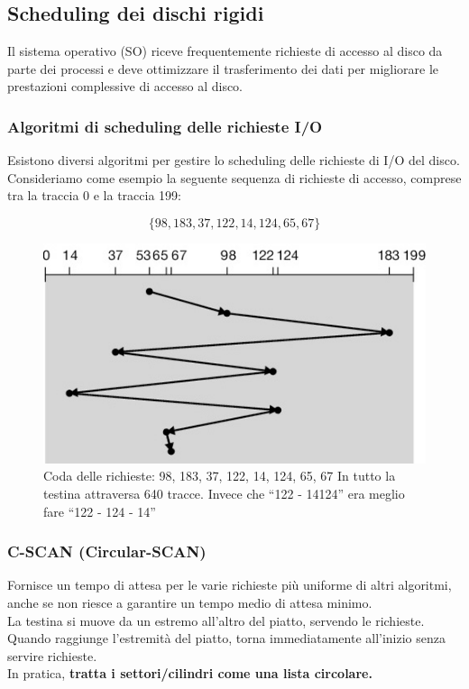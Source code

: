 \subsection{Scheduling dei dischi rigidi}

Il sistema operativo (SO) riceve frequentemente richieste di accesso al disco da parte dei processi e deve ottimizzare il trasferimento dei dati per migliorare le prestazioni complessive di accesso al disco.


\subsubsection{Algoritmi di scheduling delle richieste I/O}

Esistono diversi algoritmi per gestire lo scheduling delle richieste di I/O del disco. Consideriamo come esempio la seguente sequenza di richieste di accesso, comprese tra la traccia 0 e la traccia 199:

\[
\{ 98, 183, 37, 122, 14, 124, 65, 67 \}
\]


\begin{figure}[h] \centering \includegraphics[width=0.25\linewidth]{images/scheduling_hdd_98.png}
\caption{Coda delle richieste: 98, 183, 37, 122, 14, 124, 65, 67 In tutto la testina attraversa 640 tracce. Invece che “122 - 14124” era meglio fare “122 - 124 - 14” }
\end{figure}

\subsubsection{C-SCAN (Circular-SCAN)}
Fornisce un tempo di attesa per le varie richieste più uniforme di altri algoritmi, anche se non riesce a garantire un tempo medio di attesa minimo.\\
La testina si muove da un estremo all’altro del piatto, servendo le richieste.\\
Quando raggiunge l’estremità del piatto, torna immediatamente all’inizio senza servire richieste.\\
In pratica, \textbf{tratta i settori/cilindri come una lista circolare.}\\

